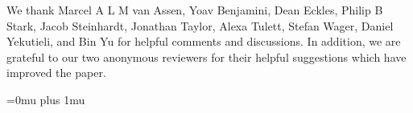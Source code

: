 \documentclass[aoas, preprint]{imsart}
\theoremstyle{definition}
\theoremstyle{custom}
\begin{document}
  We thank Marcel A L M van Assen, Yoav Benjamini, Dean Eckles, Philip B Stark, Jacob Steinhardt, Jonathan Taylor, Alexa Tulett, Stefan Wager, Daniel Yekutieli, and Bin Yu for helpful comments and discussions. In addition, we are grateful to our two anonymous reviewers for their helpful suggestions which have improved the paper.

\begin{supplement}
  \label{suppA}
\end{supplement}

\Urlmuskip=0mu plus 1mu\relax


\end{document}
